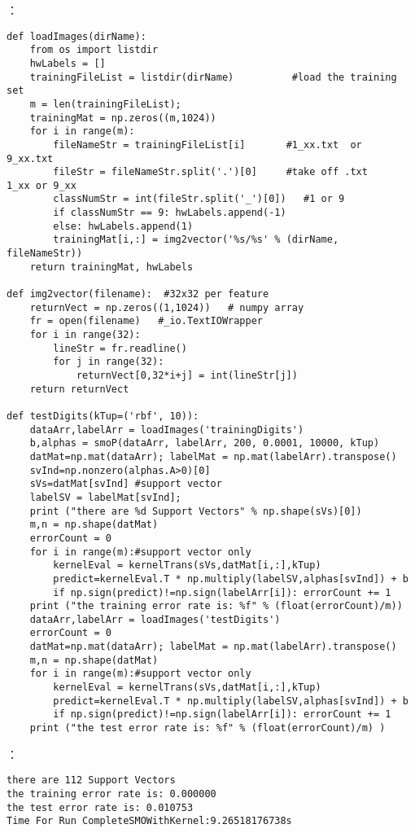 ：
\begin{lstlisting}
def loadImages(dirName):
    from os import listdir
    hwLabels = []
    trainingFileList = listdir(dirName)          #load the training set
    m = len(trainingFileList);
    trainingMat = np.zeros((m,1024))
    for i in range(m):
        fileNameStr = trainingFileList[i]       #1_xx.txt  or  9_xx.txt
        fileStr = fileNameStr.split('.')[0]     #take off .txt     1_xx or 9_xx
        classNumStr = int(fileStr.split('_')[0])   #1 or 9
        if classNumStr == 9: hwLabels.append(-1)
        else: hwLabels.append(1)
        trainingMat[i,:] = img2vector('%s/%s' % (dirName, fileNameStr))
    return trainingMat, hwLabels

def img2vector(filename):  #32x32 per feature
    returnVect = np.zeros((1,1024))   # numpy array
    fr = open(filename)   #_io.TextIOWrapper
    for i in range(32):
        lineStr = fr.readline()
        for j in range(32):
            returnVect[0,32*i+j] = int(lineStr[j])
    return returnVect

def testDigits(kTup=('rbf', 10)):
    dataArr,labelArr = loadImages('trainingDigits')
    b,alphas = smoP(dataArr, labelArr, 200, 0.0001, 10000, kTup)
    datMat=np.mat(dataArr); labelMat = np.mat(labelArr).transpose()
    svInd=np.nonzero(alphas.A>0)[0]
    sVs=datMat[svInd] #support vector
    labelSV = labelMat[svInd];
    print ("there are %d Support Vectors" % np.shape(sVs)[0])
    m,n = np.shape(datMat)
    errorCount = 0
    for i in range(m):#support vector only
        kernelEval = kernelTrans(sVs,datMat[i,:],kTup)
        predict=kernelEval.T * np.multiply(labelSV,alphas[svInd]) + b
        if np.sign(predict)!=np.sign(labelArr[i]): errorCount += 1
    print ("the training error rate is: %f" % (float(errorCount)/m))
    dataArr,labelArr = loadImages('testDigits')
    errorCount = 0
    datMat=np.mat(dataArr); labelMat = np.mat(labelArr).transpose()
    m,n = np.shape(datMat)
    for i in range(m):#support vector only
        kernelEval = kernelTrans(sVs,datMat[i,:],kTup)
        predict=kernelEval.T * np.multiply(labelSV,alphas[svInd]) + b
        if np.sign(predict)!=np.sign(labelArr[i]): errorCount += 1
    print ("the test error rate is: %f" % (float(errorCount)/m) )
\end{lstlisting}

：
\begin{lstlisting}
there are 112 Support Vectors
the training error rate is: 0.000000
the test error rate is: 0.010753
Time For Run CompleteSMOWithKernel:9.26518176738s
\end{lstlisting}

